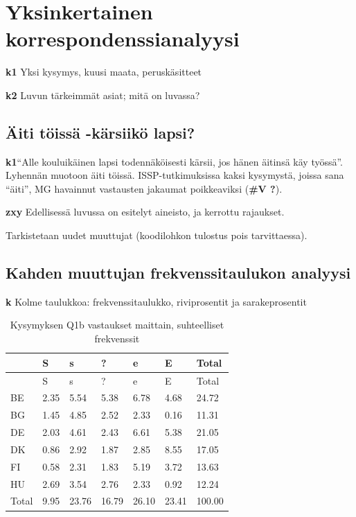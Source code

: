\documentclass[
  finnish,
]{book}
\begin{document}
\hypertarget{yksinkertainen-korrespondenssianalyysi}{%
\chapter{Yksinkertainen
korrespondenssianalyysi}\label{yksinkertainen-korrespondenssianalyysi}}

\textbf{k1} Yksi kysymys, kuusi maata, peruskäsitteet

\textbf{k2} Luvun tärkeimmät asiat; mitä on luvassa?

\hypertarget{uxe4iti-tuxf6issuxe4--kuxe4rsiikuxf6-lapsi}{%
\section{Äiti töissä -kärsiikö
lapsi?}\label{uxe4iti-tuxf6issuxe4--kuxe4rsiikuxf6-lapsi}}

\textbf{k1}``Alle kouluikäinen lapsi todennäköisesti kärsii, jos hänen
äitinsä käy työssä''. Lyhennän muotoon äiti töissä. ISSP-tutkimuksissa
kaksi kysymystä, joissa sana ``äiti'', MG havainnut vastausten jakaumat
poikkeaviksi (\textbf{\#V ?}).

\textbf{zxy} Edellisessä luvussa on esitelyt aineisto, ja kerrottu
rajaukset.

Tarkistetaan uudet muuttujat (koodilohkon tulostus pois tarvittaessa).

\hypertarget{kahden-muuttujan-frekvenssitaulukon-analyysi}{%
\section{Kahden muuttujan frekvenssitaulukon
analyysi}\label{kahden-muuttujan-frekvenssitaulukon-analyysi}}

\textbf{k} Kolme taulukkoa: frekvenssitaulukko, riviprosentit ja
sarakeprosentit

\begin{longtable}[]{@{}lllllll@{}}
\caption{Kysymyksen Q1b vastaukset maittain, suhteelliset
frekvenssit}\tabularnewline
\toprule
& S & s & ? & e & E & Total\tabularnewline
\midrule
\endfirsthead
\toprule
& S & s & ? & e & E & Total\tabularnewline
\midrule
\endhead
BE & 2.35 & 5.54 & 5.38 & 6.78 & 4.68 & 24.72\tabularnewline
BG & 1.45 & 4.85 & 2.52 & 2.33 & 0.16 & 11.31\tabularnewline
DE & 2.03 & 4.61 & 2.43 & 6.61 & 5.38 & 21.05\tabularnewline
DK & 0.86 & 2.92 & 1.87 & 2.85 & 8.55 & 17.05\tabularnewline
FI & 0.58 & 2.31 & 1.83 & 5.19 & 3.72 & 13.63\tabularnewline
HU & 2.69 & 3.54 & 2.76 & 2.33 & 0.92 & 12.24\tabularnewline
Total & 9.95 & 23.76 & 16.79 & 26.10 & 23.41 & 100.00\tabularnewline
\bottomrule
\end{longtable}
\end{document}
